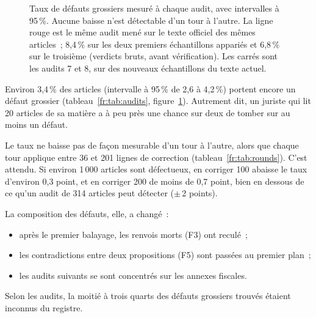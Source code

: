 \documentclass[11pt,a4paper]{article}
\begin{document}
\begin{figure}[ht]
\centering
{}
\caption{Taux de défauts grossiers mesuré à chaque audit, avec intervalles à 95\,\%. Aucune baisse n'est détectable d'un tour à l'autre. La ligne rouge est le même audit mené sur le texte officiel des mêmes articles~; 8,4\,\% sur les deux premiers échantillons appariés et 6,8\,\% sur le troisième (verdicts bruts, avant vérification). Les carrés sont les audits 7 et 8, sur des nouveaux échantillons du texte actuel.}
\label{fr:fig:audits}
\end{figure}

Environ 3,4\,\% des articles (intervalle à 95\,\% de 2,6 à 4,2\,\%) portent encore un défaut grossier (tableau~\ref{fr:tab:audits}, figure~\ref{fr:fig:audits}). Autrement dit, un juriste qui lit 20 articles de sa matière a à peu près une chance sur deux de tomber sur au moins un défaut.

Le taux ne baisse pas de façon mesurable d'un tour à l'autre, alors que chaque tour applique entre 36 et 201 lignes de correction (tableau~\ref{fr:tab:rounds}). C'est attendu. Si environ 1\,000 articles sont défectueux, en corriger 100 abaisse le taux d'environ 0,3 point, et en corriger 200 de moins de 0,7 point, bien en dessous de ce qu'un audit de 314 articles peut détecter ($\pm$\,2 points).

La composition des défauts, elle, a changé~:
\begin{itemize}
  \item après le premier balayage, les renvois morts (F3) ont reculé~;
  \item les contradictions entre deux propositions (F5) sont passées au premier plan~;
  \item les audits suivants se sont concentrés sur les annexes fiscales.
\end{itemize}
Selon les audits, la moitié à trois quarts des défauts grossiers trouvés étaient inconnus du registre.
\end{document}
